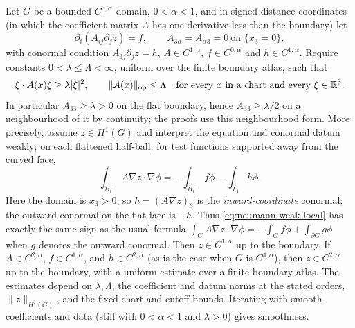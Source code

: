 \begin{theorem}
\label{thm:boundary-neumann}
Let $G$ be a bounded $C^{3,\alpha}$ domain, $0<\alpha<1$, and in signed-distance
coordinates (in which the coefficient matrix $A$ has one derivative less than
the boundary) let
\begin{equation}\label{eq:neumann-flat}
  \partial_i(A_{ij}\partial_jz)=f,
  \qquad
  A_{3\alpha}=A_{\alpha3}=0\ \text{on }\{x_3=0\},
\end{equation}
with conormal condition $A_{3j}\partial_jz=h$, $A\in C^{1,\alpha}$,
$f\in C^{0,\alpha}$ and $h\in C^{1,\alpha}$.  Require constants
$0<\lambda\le\Lambda<\infty$, uniform over the finite boundary atlas, such that
\[
 \xi\cdot A(x)\xi\ge\lambda|\xi|^2,
 \qquad \|A(x)\|_{\mathrm{op}}\le\Lambda
 \quad\text{for every }x\text{ in a chart and every }\xi\in\mathbb R^3.
\]
In particular $A_{33}\ge\lambda>0$ on the flat boundary, hence $A_{33}\ge\lambda/2$
on a neighbourhood of it by continuity; the proofs use this neighbourhood form.
More precisely, assume
$z\in H^1(G)$ and interpret the equation and conormal datum weakly; on each
flattened half-ball, for test functions supported away from the curved face,
\begin{equation}\label{eq:neumann-weak-local}
 \int_{B_1^+}A\nabla z\cdot\nabla\phi
 =-\int_{B_1^+}f\phi-\int_{\Gamma_1}h\phi .
\end{equation}
Here the domain is $x_3>0$, so $h=(A\nabla z)_3$ is the
\emph{inward-coordinate} conormal; the outward conormal on the flat face is
$-h$.  Thus \eqref{eq:neumann-weak-local} has exactly the same sign as the
usual formula
$\int_GA\nabla z\cdot\nabla\phi=-\int_Gf\phi+\int_{\partial G}g\phi$
when $g$ denotes the outward conormal.
Then $z\in C^{1,\alpha}$ up to the boundary.  If
$A\in C^{2,\alpha}$, $f\in C^{1,\alpha}$, and $h\in C^{2,\alpha}$ (as is the case when $G$
is $C^{4,\alpha}$), then
$z\in C^{2,\alpha}$ up to the boundary, with a uniform estimate over a
finite boundary atlas.  The estimates depend on $\lambda,\Lambda$, the
coefficient and datum norms at the stated orders, $\|z\|_{H^1(G)}$, and the
fixed chart and cutoff bounds.  Iterating with smooth coefficients and data (still with $0<\alpha<1$ and
$\lambda>0$) gives smoothness.
\end{theorem}

